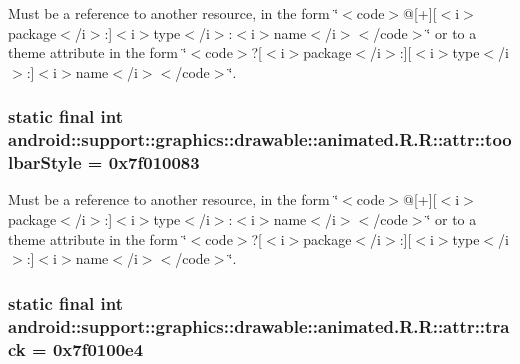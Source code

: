 Must be a reference to another resource, in the form \char`\"{}$<$code$>$@\mbox{[}+\mbox{]}\mbox{[}$<$i$>$package$<$/i$>$:\mbox{]}$<$i$>$type$<$/i$>$:$<$i$>$name$<$/i$>$$<$/code$>$\char`\"{} or to a theme attribute in the form \char`\"{}$<$code$>$?\mbox{[}$<$i$>$package$<$/i$>$:\mbox{]}\mbox{[}$<$i$>$type$<$/i$>$:\mbox{]}$<$i$>$name$<$/i$>$$<$/code$>$\char`\"{}. \hypertarget{classandroid_1_1support_1_1graphics_1_1drawable_1_1animated_1_1_r_1_1attr_f1d6acf64a345e27c795aeadbe3a621e}{
\subsubsection[{toolbarStyle}]{\setlength{\rightskip}{0pt plus 5cm}static final int android::support::graphics::drawable::animated.R.R::attr::toolbarStyle = 0x7f010083}}
\label{classandroid_1_1support_1_1graphics_1_1drawable_1_1animated_1_1_r_1_1attr_f1d6acf64a345e27c795aeadbe3a621e}


Must be a reference to another resource, in the form \char`\"{}$<$code$>$@\mbox{[}+\mbox{]}\mbox{[}$<$i$>$package$<$/i$>$:\mbox{]}$<$i$>$type$<$/i$>$:$<$i$>$name$<$/i$>$$<$/code$>$\char`\"{} or to a theme attribute in the form \char`\"{}$<$code$>$?\mbox{[}$<$i$>$package$<$/i$>$:\mbox{]}\mbox{[}$<$i$>$type$<$/i$>$:\mbox{]}$<$i$>$name$<$/i$>$$<$/code$>$\char`\"{}. \hypertarget{classandroid_1_1support_1_1graphics_1_1drawable_1_1animated_1_1_r_1_1attr_eb8cb20acaee73b00936e2d41c0b8bb9}{
\subsubsection[{track}]{\setlength{\rightskip}{0pt plus 5cm}static final int android::support::graphics::drawable::animated.R.R::attr::track = 0x7f0100e4}}
\label{classandroid_1_1support_1_1graphics_1_1drawable_1_1animated_1_1_r_1_1attr_eb8cb20acaee73b00936e2d41c0b8bb9}


